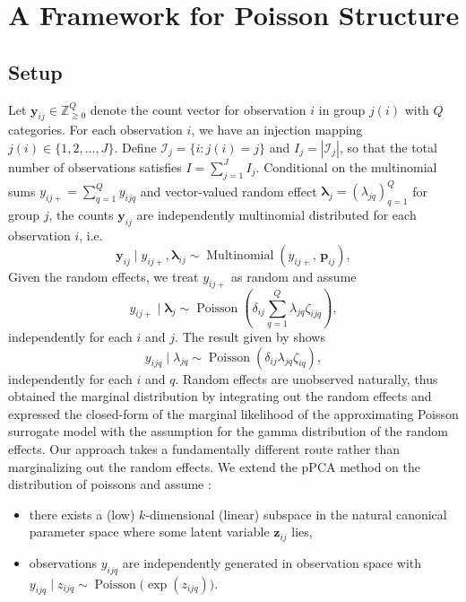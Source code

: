 \documentclass[]{report}
\theoremstyle{definition}
\begin{document}
	
\thispagestyle{empty}

\section{A Framework for Poisson Structure}
\subsection{Setup}
Let $\bm{y}_{ij} \in \mathbb{Z}_{\geq 0}^Q$ denote the count vector for observation $i$ in group $j(i)$ with $Q$ categories. For each observation $i$, we have an injection mapping $j(i) \in \{1, 2, \ldots, J\}$. Define $\mathcal{I}_j = \{i : j(i) = j\}$ and $I_j = |\mathcal{I}_j|$, so that the total number of observations satisfies $I = \sum_{j=1}^J I_j$. Conditional on the multinomial sums $y_{ij+}=\sum_{q=1}^{Q}y_{ijq}$ and vector-valued random effect $\bm{\lambda}_{j}=(\lambda_{jq})_{q=1}^{Q}$ for group $j$, the counts $\bm{y}_{ij}$ are independently multinomial distributed for each observation $i$, i.e.
\begin{equation}
    \bm{y}_{ij} \mid  y_{ij+} , \bm{\lambda}_{ij}
    \sim \operatorname{Multinomial}\left(y_{ij+},\, \bm{p}_{ij}\right),
\end{equation}
Given the random effects, we treat $y_{ij+}$ as random and assume
\begin{equation}
    y_{ij+}\mid \bm{\lambda}_{j}\sim \operatorname{Poisson}(\delta_{ij}\sum_{q=1}^{Q}\lambda_{jq}\zeta_{ijq}),
\end{equation}
independently for each $i$ and $j$. The result given by \cite{lee2017poissontrickextensionsfitting} shows
\begin{equation}
    y_{ijq}\mid \lambda_{jq}\sim \operatorname{Poisson}(\delta_{ij}\lambda_{jq}\zeta_{iq}),
\end{equation}
independently for each $i$ and $q$. Random effects are unobserved naturally, thus \citet{lee2017poissontrickextensionsfitting} obtained the marginal distribution by integrating out the random effects and expressed the closed-form of the marginal likelihood of the approximating Poisson surrogate model with the assumption for the gamma distribution of the random effects. Our approach takes a fundamentally different route rather than marginalizing out the random effects. We extend the pPCA method on the distribution of poissons and assume \cite{chiquet2018variational}:
\begin{itemize}
    \item there exists a (low) $k$-dimensional (linear) subspace in the natural canonical parameter space where some latent variable $\bm{z}_{ij}$ lies,
    \item observations $y_{ijq}$ are independently generated in observation space with $y_{ijq}\mid z_{ijq}\sim \operatorname{Poisson}\bigl(\exp(z_{ijq})\bigr)$.
\end{itemize}
\end{document}
